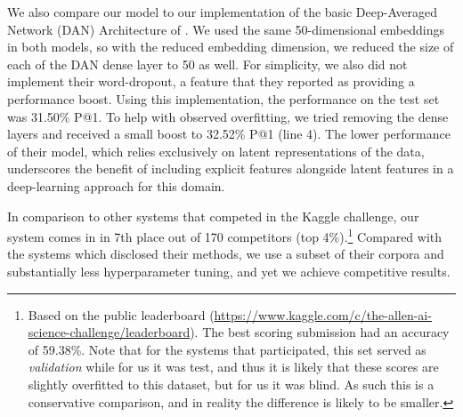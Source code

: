We also compare our model to our implementation of the basic Deep-Averaged Network (DAN) Architecture of \citet{Iyyer2015}.  %
We used the same 50-dimensional embeddings in both models, so with the reduced embedding dimension, we reduced the size of each of the DAN dense layer to 50 as well.  For simplicity, we also did not implement their word-dropout, a feature that they reported as providing a performance boost. Using this implementation, the performance on the test set was 31.50\% P@1.  To help with observed overfitting, we tried removing the dense layers and received a small boost to 32.52\% P@1 (line 4).  
The lower performance of their model, which relies exclusively on latent representations of the data, underscores the benefit of including explicit features alongside latent features in a deep-learning approach for this domain.

In comparison to other systems that competed in the Kaggle challenge, our system comes in in 7th place out of 170 competitors (top 4\%).\footnote{Based on the public leaderboard ({\scriptsize \url{https://www.kaggle.com/c/the-allen-ai-science-challenge/leaderboard}}). The best scoring submission had an accuracy of 59.38\%.  Note that for the systems that participated, this set served as \emph{validation} while for us it was test, and thus it is likely that these scores are slightly overfitted to this dataset, but for us it was blind.  As such this is a conservative comparison, and in reality the difference is likely to be smaller.}  Compared with the systems which disclosed their methods, we use a subset of their corpora and substantially less hyperparameter tuning, and yet we achieve competitive results.  


